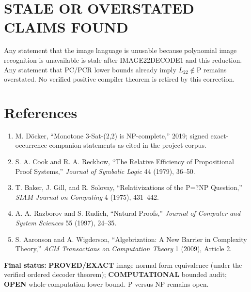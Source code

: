 \documentclass[11pt]{article}
\newcommand{\Ltwo}{L_{22}}
\newcommand{\status}[1]{\textbf{#1}}
\begin{document}
\section*{STALE OR OVERSTATED CLAIMS FOUND}
Any statement that the image language is unusable because polynomial image recognition is unavailable is stale after IMAGE22DECODE1 and this reduction.  Any statement that PC/PCR lower bounds already imply $\Ltwo\notin\mathrm P$ remains overstated.  No verified positive compiler theorem is retired by this correction.

\section*{References}
\begin{enumerate}[leftmargin=*]
\item M. D\"ocker, ``Monotone 3-Sat-(2,2) is NP-complete,'' 2019; signed exact-occurrence companion statements as cited in the project corpus.
\item S. A. Cook and R. A. Reckhow, ``The Relative Efficiency of Propositional Proof Systems,'' \emph{Journal of Symbolic Logic} 44 (1979), 36--50.
\item T. Baker, J. Gill, and R. Solovay, ``Relativizations of the P=?NP Question,'' \emph{SIAM Journal on Computing} 4 (1975), 431--442.
\item A. A. Razborov and S. Rudich, ``Natural Proofs,'' \emph{Journal of Computer and System Sciences} 55 (1997), 24--35.
\item S. Aaronson and A. Wigderson, ``Algebrization: A New Barrier in Complexity Theory,'' \emph{ACM Transactions on Computation Theory} 1 (2009), Article 2.
\end{enumerate}

\bigskip
\noindent\textbf{Final status:} \status{PROVED/EXACT} image-normal-form equivalence (under the verified ordered decoder theorem); \status{COMPUTATIONAL} bounded audit; \status{OPEN} whole-computation lower bound.  P versus NP remains open.

\end{document}
